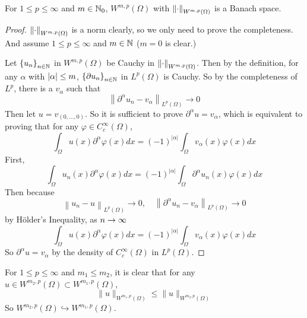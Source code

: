 \begin{prop}
	For $1 \leq p \leq \infty$ and $m \in \mathbb{N}_0$, $W^{m, p}(\Omega)$ with $\left\lVert\cdot\right\lVert_{W^{m, p}(\Omega)}$ is a Banach space.
\end{prop}
\begin{proof}
	$\left\lVert\cdot\right\lVert_{W^{m, p}(\Omega)}$ is a norm clearly, so we only need to prove the completeness. And assume $1 \leq p \leq \infty$ and $m \in \mathbb{N}$ ($m = 0$ is clear.)

	\noindent Let $\left\{u_n\right\}_{n \in \mathbb{N}}$ in $W^{m, p}(\Omega)$ be Cauchy in $\left\lVert\cdot\right\lVert_{W^{m, p}(\Omega)}$. Then by the definition, for any $\alpha$ with $\left\lvert\alpha\right\lvert \leq m$, $\left\{\partial u_n\right\}_{n \in \mathbb{N}}$ in $L^p(\Omega)$ is Cauchy. So by the completeness of $L^p$, there is a $v_\alpha$ such that
	\begin{equation*}
		\left\|\partial^\alpha u_n-v_\alpha\right\|_{L^p(\Omega)} \longrightarrow 0
	\end{equation*}
	Then let $u = v_{(0, \ldots, 0)}$. So it is sufficient to prove $\partial^\alpha u = v_\alpha$, which is equivalent to proving that for any $\varphi \in C_c^\infty(\Omega)$,
	\begin{equation*}
		\int_{\Omega} u(x) \partial^\alpha \varphi(x) d x=(-1)^{|\alpha|} \int_{\Omega} v_\alpha(x) \varphi(x) d x
	\end{equation*}
	First,
	\begin{equation*}
		\int_{\Omega} u_n(x) \partial^\alpha \varphi(x) d x=(-1)^{|\alpha|} \int_{\Omega} \partial^\alpha u_n(x) \varphi(x) d x
	\end{equation*}
	Then because 
	\begin{equation*}
		\left\|u_n-u\right\|_{L^p(\Omega)} \rightarrow 0,\quad\left\|\partial^\alpha u_n-v_\alpha\right\|_{L^p(\Omega)} \rightarrow 0
	\end{equation*}
	by H\"older's Inequality, as $n \rightarrow \infty$
	\begin{equation*}
		\int_{\Omega} u(x) \partial^\alpha \varphi(x) d x=(-1)^{|\alpha|} \int_{\Omega} v_\alpha(x) \varphi(x) d x
	\end{equation*}
	So $\partial^\alpha u=v_\alpha$ by the density of $C_c^\infty(\Omega)$ in $L^p(\Omega)$.
\end{proof}
\begin{rmk}
	For $1 \leq p \leq \infty$ and $m_1 \leq m_2$, it is clear that for any $u \in W^{m_2, p}(\Omega) \subset W^{m_1, p}(\Omega)$,
	\begin{equation*}
		\|u\|_{W^{m_1, p}(\Omega)} \leq\|u\|_{W^{m_2, p}(\Omega)}
	\end{equation*}
	So $W^{m_2, p}(\Omega) \hookrightarrow W^{m_1, p}(\Omega)$.
\end{rmk}

